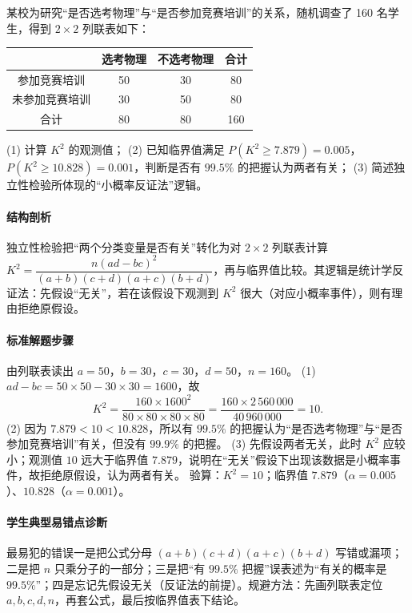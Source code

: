 \begin{problem}
某校为研究“是否选考物理”与“是否参加竞赛培训”的关系，随机调查了 160 名学生，得到 $2\times2$ 列联表如下：
\begin{center}
\begin{tabular}{c|cc|c}
 & 选考物理 & 不选考物理 & 合计\\
\hline
参加竞赛培训 & 50 & 30 & 80\\
未参加竞赛培训 & 30 & 50 & 80\\
\hline
合计 & 80 & 80 & 160
\end{tabular}
\end{center}
(1) 计算 $K^2$ 的观测值；
(2) 已知临界值满足 $P(K^2\ge7.879)=0.005$，$P(K^2\ge10.828)=0.001$，判断是否有 $99.5\%$ 的把握认为两者有关；
(3) 简述独立性检验所体现的“小概率反证法”逻辑。
\end{problem}
\begin{solution}
\paragraph{结构剖析}
独立性检验把“两个分类变量是否有关”转化为对 $2\times2$ 列联表计算
$K^2=\dfrac{n(ad-bc)^2}{(a+b)(c+d)(a+c)(b+d)}$，再与临界值比较。其逻辑是统计学反证法：先假设“无关”，若在该假设下观测到 $K^2$ 很大（对应小概率事件），则有理由拒绝原假设。
\paragraph{标准解题步骤}
由列联表读出 $a=50$，$b=30$，$c=30$，$d=50$，$n=160$。
(1) $ad-bc=50\times50-30\times30=1600$，故
$$K^2=\frac{160\times1600^2}{80\times80\times80\times80}=\frac{160\times2\,560\,000}{40\,960\,000}=10.$$
(2) 因为 $7.879<10<10.828$，所以有 $99.5\%$ 的把握认为“是否选考物理”与“是否参加竞赛培训”有关，但没有 $99.9\%$ 的把握。
(3) 先假设两者无关，此时 $K^2$ 应较小；观测值 $10$ 远大于临界值 $7.879$，说明在“无关”假设下出现该数据是小概率事件，故拒绝原假设，认为两者有关。
验算：$K^2=10$；临界值 $7.879$（$\alpha=0.005$）、$10.828$（$\alpha=0.001$）。
\paragraph{学生典型易错点诊断}
最易犯的错误一是把公式分母 $(a+b)(c+d)(a+c)(b+d)$ 写错或漏项；二是把 $n$ 只乘分子的一部分；三是把“有 $99.5\%$ 把握”误表述为“有关的概率是 $99.5\%$”；四是忘记先假设无关（反证法的前提）。规避方法：先画列联表定位 $a,b,c,d,n$，再套公式，最后按临界值表下结论。
\end{solution}
